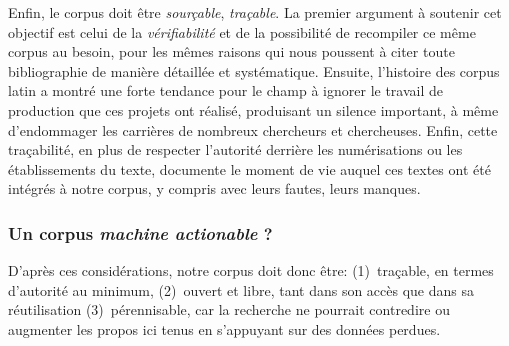 Enfin, le corpus doit être \textit{sourçable}, \textit{traçable}. La premier argument à soutenir cet objectif est celui de la \textit{vérifiabilité} et de la possibilité de recompiler ce même corpus au besoin, pour les mêmes raisons qui nous poussent à citer toute bibliographie de manière détaillée et systématique. Ensuite, l'histoire des corpus latin a montré une forte tendance pour le champ à ignorer le travail de production que ces projets ont réalisé, produisant un silence important, à même d'endommager les carrières de nombreux chercheurs et chercheuses. Enfin, cette traçabilité, en plus de respecter l'autorité derrière les numérisations ou les établissements du texte, documente le moment de vie auquel ces textes ont été intégrés à notre corpus, y compris avec leurs fautes, leurs manques.

\subsubsection{Un corpus \textit{machine actionable} ?}
\label{chap1:method-annotation}

D'après ces considérations, notre corpus doit donc être: (1)~traçable, en termes d'autorité au minimum, (2)~ouvert et libre, tant dans son accès que dans sa réutilisation (3)~pérennisable, car la recherche ne pourrait contredire ou augmenter les propos ici tenus en s'appuyant sur des données perdues.


